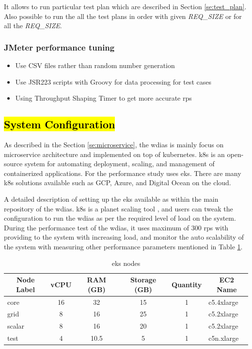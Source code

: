 It allows to run particular test plan which are described in Section \ref{se:test_plan}. Also possible to run the all the test plans in order with given \emph{REQ\_SIZE} or for all the \emph{REQ\_SIZE}.

\subsubsection{JMeter performance tuning}
\begin{itemize}
    \item Use CSV files rather than random number generation
    \item Use JSR223 scripts with Groovy for data processing for test cases
    \item Using Throughput Shaping Timer to get more accurate \acrshort{rps}
\end{itemize}


\subsection{\hl{System Configuration}}
\label{subse:test_sys_config}
As described in the Section \ref{se:microservice}, the \acrshort{wdias} is mainly focus on microservice architecture and implemented on top of kubernetes. \acrfull{k8s} is an open-source system for automating deployment, scaling, and management of containerized applications. For the performance study uses \acrfull{eks}. There are many \acrshort{k8s} solutions available such as GCP, Azure, and Digital Ocean on the cloud.

A detailed description of setting up the \acrshort{eks} available as \cite{KarunarathneWdias/Amazon_EKS.md:EKS} within the main repository of the \acrshort{wdias}.
\acrshort{k8s} is a planet scaling tool \cite{LinuxFoundationProduction-GradeKubernetes}, and users can tweak the configuration to run the \acrshort{wdias} as per the required level of load on the system. During the performance test of the \acrshort{wdias}, it uses maximum of 300 \acrshort{rps} with providing to the system with increasing load, and monitor the auto scalability of the system with measuring other performance parameters mentioned in Table \ref{tab:aws_eks_nodes}.

\begin{table}[ht]
\caption{\acrshort{eks} nodes}
\footnotesize
\begin{tabular}{lccccl}
\hline
\multicolumn{1}{c}{\textbf{Node Label}} & \textbf{vCPU} & \textbf{RAM (GB)} & \textbf{Storage (GB)} & \textbf{Quantity} & \multicolumn{1}{c}{\textbf{EC2 Name}} \\ \hline
core & 16 & 32 & 15 & 1 & c5.4xlarge \\
grid & 8 & 16 & 25 & 1 & c5.2xlarge \\
scalar & 8 & 16 & 20 & 1 & c5.2xlarge \\
test & 4 & 10.5 & 5 & 1 & c5n.xlarge \\ \hline
\end{tabular}
\label{tab:aws_eks_nodes}
\end{table}

